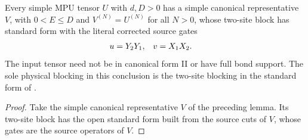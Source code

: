 \begin{lemma}
    \label{lem:mpu_simple_reduced_literal_standard_form}
    \leanok
    Every simple MPU tensor $U$ with $d,D>0$ has a simple canonical
    representative $V$, with $0<E\leq D$ and $V^{(N)}=U^{(N)}$ for all $N>0$,
    whose two-site block has standard form with the literal corrected source
    gates
    \begin{align}
        u & =Y_2Y_1, & v & =X_1X_2.
        \notag
    \end{align}
    The input tensor need not be in canonical form II or have full bond
    support. The sole physical blocking in this conclusion is the two-site
    blocking in the standard form of \cite[Definition~III.9]{Cirac2017MPU}.
\end{lemma}

\begin{proof}\leanok
    Take the simple canonical representative $V$ of the preceding lemma.
    Its two-site block has the open standard form built from the source
    cuts of $V$, whose gates are the source operators of $V$.
\end{proof}
